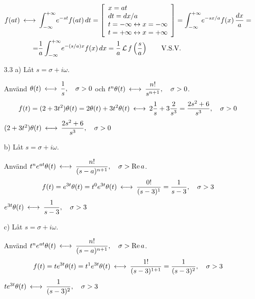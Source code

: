\begin{task}{3.2}
	\begin{align*}
	f(at)\llra
	&\int_{-\infty}^{+\infty}\! e^{-st}f(at) \, dt=
	\left[\begin{array}{l}
	x=at \\
	dt=dx/a \\
	t=-\infty\leftrightarrow x=-\infty \\
	t=+\infty\leftrightarrow x=+\infty
	\end{array}\right] =
	\int_{-\infty}^{+\infty}\! e^{-sx/a}f(x) \, \frac{dx}{a}= \\ =
	&\frac{1}{a}\int_{-\infty}^{+\infty}\! e^{-(s/a)x}f(x) \, dx=
	\frac{1}{a}\laplace f\left(\frac{s}{a}\right)\mproof
	\end{align*}
\end{task}

\begin{task}{3.3 a)}
	Låt $s=\sigma+i\omega$.
	
	Använd $\theta(t)\llra \dfrac{1}{s}\cond{\sigma > 0}$ och $t^n\theta(t)\llra\dfrac{n!}{s^{n+1}}\cond{\sigma > 0}$.
	\begin{align*}
	f(t)=
	(2+3t^2)\theta(t)=
	2\theta(t)+3t^2\theta(t)\llra
	2\frac{1}{s}+3\frac{2}{s^3}=
	\frac{2s^2+6}{s^3}\cond{\sigma > 0}
	\end{align*}
	\ans $(2+3t^2)\theta(t)\llra\dfrac{2s^2+6}{s^3}\cond{\sigma > 0}$
\end{task}

\begin{task}{b)}
	Låt $s=\sigma+i\omega$.
	
	Använd $t^ne^{at}\theta(t)\llra \dfrac{n!}{(s-a)^{n+1}}\cond{\sigma > \Re a}$.
	\begin{align*}
	f(t)=
	e^{3t}\theta(t)=
	t^0e^{3t}\theta(t)\llra
	\frac{0!}{(s-3)^{1}}=
	\frac{1}{s-3}\cond{\sigma > 3}
	\end{align*}
	\ans $e^{3t}\theta(t)\llra\dfrac{1}{s-3}\cond{\sigma > 3}$
\end{task}

\begin{task}{c)}
	Låt $s=\sigma+i\omega$.
	
	Använd $t^ne^{at}\theta(t)\llra \dfrac{n!}{(s-a)^{n+1}}\cond{\sigma > \Re a}$.
	\begin{align*}
	f(t)=
	te^{3t}\theta(t)=
	t^1e^{3t}\theta(t)\llra
	\frac{1!}{(s-3)^{1+1}}=
	\frac{1}{(s-3)^2}\cond{\sigma > 3}
	\end{align*}
	\ans $te^{3t}\theta(t)\llra\dfrac{1}{(s-3)^2}\cond{\sigma > 3}$
\end{task}

